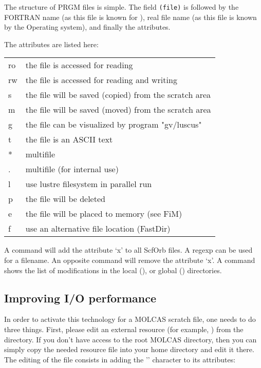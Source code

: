 The structure of PRGM files is simple. The field {\tt (file)} is followed by the 
FORTRAN name (as this file is known for \molcas), real file name (as this file is known by the Operating system), and finally the attributes. 

The attributes are listed here:
\begin{tabular}{|l|l|}
\hline
ro & the file is accessed for reading\\
rw & the file is accessed for reading and writing\\
s  & the file will be saved (copied) from the scratch area\\
m  & the file will be saved (moved) from the scratch area\\
g  & the file can be visualized by program "gv/luscus"\\
t  & the file is an ASCII text\\
*  & multifile\\
.  & multifile (for internal use)\\
l  & use lustre filesystem in parallel run\\
p  & the file will be deleted\\
e  & the file will be placed to memory (see FiM)\\
f  & use an alternative file location (FastDir)\\
\hline
\end{tabular}

A command  will add the attribute `x' to all ScfOrb files. A regexp can be used for a filename. 
An opposite command  will remove the attribute `x'. 
A command  shows the list of modifications in the local (), or global () 
directories.  


\subsection{\label{MT:sec:fim} Improving I/O performance}

In order to activate this technology for a MOLCAS scratch file, one needs to
do three things. First, please edit an external resource  (for example,
) from the  directory. If you don't
have access to the root MOLCAS directory, then you can simply copy the
needed resource file into your home  directory and edit it there.
The editing of the file consists in adding the '' character to its
attributes:

